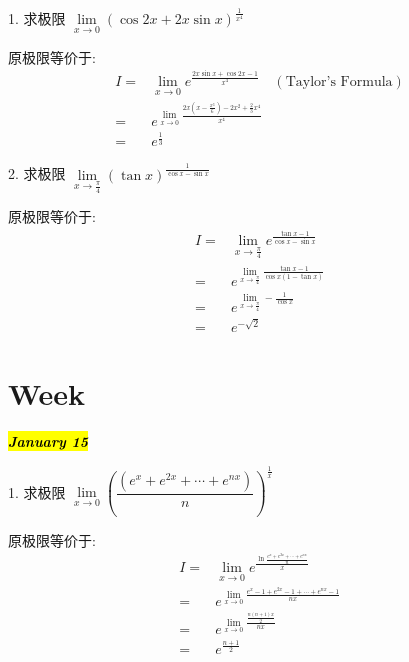 1. 求极限 $\lim\limits_{x\to 0}(\cos 2x+2x\sin x)^{\frac{1}{x^{4}}}$
\begin{solution}

	原极限等价于:
	\begin{align*}
		I = & \lim\limits_{x\to 0}e^{\frac{2x\sin x+\cos 2x-1}{x^{4}}}\quad (\text{Taylor's Formula})\\
		  = & e^{\lim\limits_{x\to 0}\frac{2x(x-\frac{x^{3}}{6})-2x^{2}+\frac{2}{3}x^{4}}{x^{4}}}\\
		  = & e^{\frac{1}{3}}
	\end{align*}
\end{solution}

2. 求极限 $\lim\limits_{x\to \frac{\pi}{4}}\left( \tan x\right) ^{\frac{1}{\cos x-\sin x}}$
\begin{solution}

	原极限等价于:
	\begin{align*}
		I = & \lim\limits_{x\to \frac{\pi}{4}}e^{\frac{\tan x-1}{\cos x-\sin x}}\\
		  = & e^{\lim\limits_{x\to \frac{\pi}{4}}\frac{\tan x-1}{\cos x(1-\tan x)}}\\
		  = & e^{\lim\limits_{x\to \frac{\pi}{4}}-\frac{1}{\cos x}}\\
		  = & e^{-\sqrt{2}}
	\end{align*}
\end{solution}
\section{Week }
\hl{\textbf{\textit{January 15}}}

1. 求极限 $\lim\limits_{x\to 0}\left(\dfrac{(e^{x}+e^{2x}+\cdots +e^{nx})}{n} \right)^{\frac{1}{x}} $
\begin{solution}
	
	原极限等价于:
	\begin{align*}
		I = & \lim\limits_{x\to 0}e^{\frac{\ln \frac{e^{x}+e^{2x}+\cdots +e^{nx}}{n}}{x}}\\
		  = & e^{\lim\limits_{x\to 0}\frac{e^{x}-1+e^{2x}-1+\cdots +e^{nx}-1}{nx}}\\
		  = & e^{\lim\limits_{x\to 0}\frac{\frac{n(n+1)x}{2}}{nx}}\\
		  = & e^{\frac{n+1}{2}}
	\end{align*}
\end{solution}

